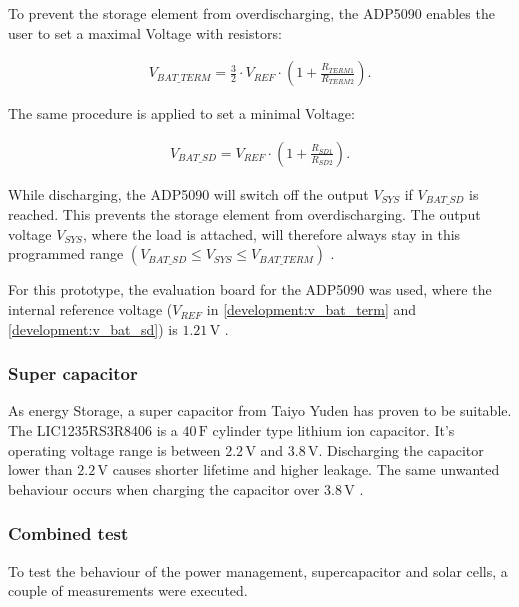 To prevent the storage element from overdischarging, the ADP5090 enables the user to set a maximal Voltage with resistors:

\begin{align}
	V_{BAT\_TERM} = \frac{3}{2}\cdot V_{REF}\cdot\left(1+\frac{R_{TERM1}}{R_{TERM2}} \right).\label{development:v_bat_term} 
\end{align} 

The same procedure is applied to set a minimal Voltage:

\begin{align}
	V_{BAT\_SD}=V_{REF}\cdot \left(1+\frac{R_{SD1}}{R_{SD2}} \right).\label{development:v_bat_sd} 
\end{align}  

While discharging, the ADP5090 will switch off the output $V_{SYS}$ if $V_{BAT\_SD}$ is reached. This prevents the storage element from overdischarging.
The output voltage $V_{SYS}$, where the load is attached, will therefore always stay in this programmed range $(V_{BAT\_SD}\le V_{SYS}\le V_{BAT\_TERM})$ \cite{adp}.

For this prototype, the evaluation board for the ADP5090 was used, where the internal reference voltage ($V_{REF}$ in \eqref{development:v_bat_term} and \eqref{development:v_bat_sd}) is $1.21\,\text{V}$ \cite{adp_eval}.

\subsubsection{Super capacitor}
As energy Storage, a super capacitor from Taiyo Yuden has proven to be suitable.
The LIC1235RS3R8406 is a $40\,\text{F}$ cylinder type lithium ion capacitor.
It's operating voltage range is between $2.2\,\text{V}$ and $3.8\,\text{V}$.
Discharging the capacitor lower than $2.2\,\text{V}$ causes shorter lifetime and higher leakage.
The same unwanted behaviour occurs when charging the capacitor over $3.8\,\text{V}$ \cites{yuden}.

\subsubsection{Combined test}
To test the behaviour of the power management, supercapacitor and solar cells, a couple of measurements were executed.

